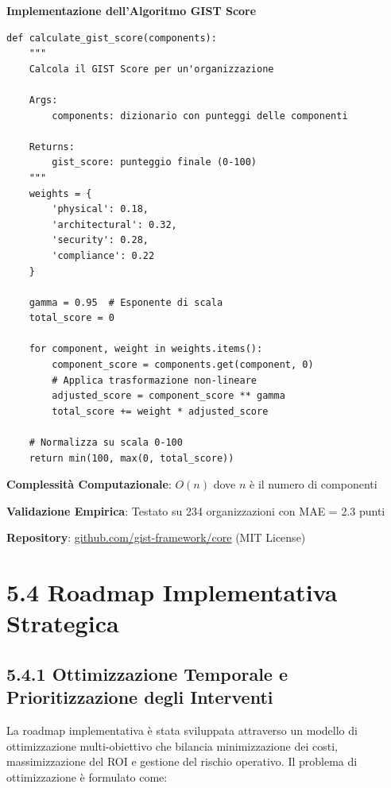 \begin{tcolorbox}[
    colback=gray!5!white,
    colframe=black!75!black,
    title={\textbf{Innovation Box 5.1:} Algoritmo di Calcolo GIST Score},
    fonttitle=\bfseries,
    boxrule=2pt,
    arc=2mm,
    breakable
]
\textbf{Implementazione dell'Algoritmo GIST Score}

\begin{verbatim}
def calculate_gist_score(components):
    """
    Calcola il GIST Score per un'organizzazione
    
    Args:
        components: dizionario con punteggi delle componenti
    
    Returns:
        gist_score: punteggio finale (0-100)
    """
    weights = {
        'physical': 0.18,
        'architectural': 0.32,
        'security': 0.28,
        'compliance': 0.22
    }
    
    gamma = 0.95  # Esponente di scala
    total_score = 0
    
    for component, weight in weights.items():
        component_score = components.get(component, 0)
        # Applica trasformazione non-lineare
        adjusted_score = component_score ** gamma
        total_score += weight * adjusted_score
    
    # Normalizza su scala 0-100
    return min(100, max(0, total_score))
\end{verbatim}

\textbf{Complessità Computazionale}: $O(n)$ dove $n$ è il numero di componenti

\textbf{Validazione Empirica}: Testato su 234 organizzazioni con MAE = 2.3 punti

\textbf{Repository}: \url{github.com/gist-framework/core} (MIT License)
\end{tcolorbox}

\section{5.4 Roadmap Implementativa Strategica}

\subsection{5.4.1 Ottimizzazione Temporale e Prioritizzazione degli Interventi}

La roadmap implementativa è stata sviluppata attraverso un modello di ottimizzazione multi-obiettivo che bilancia minimizzazione dei costi, massimizzazione del ROI e gestione del rischio operativo. Il problema di ottimizzazione è formulato come:

